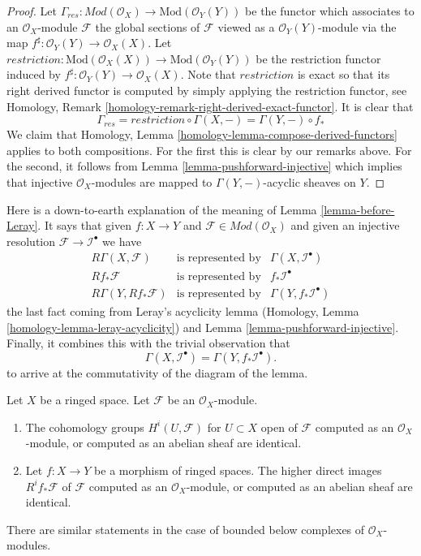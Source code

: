 \begin{proof}
Let
$\Gamma_{res} : \textit{Mod}(\mathcal{O}_X) \to \text{Mod}(\mathcal{O}_Y(Y))$
be the functor which associates to an $\mathcal{O}_X$-module $\mathcal{F}$
the global sections of $\mathcal{F}$ viewed as a $\mathcal{O}_Y(Y)$-module
via the map $f^\sharp : \mathcal{O}_Y(Y) \to \mathcal{O}_X(X)$. Let
$restriction : \text{Mod}(\mathcal{O}_X(X)) \to \text{Mod}(\mathcal{O}_Y(Y))$
be the restriction functor induced by
$f^\sharp : \mathcal{O}_Y(Y) \to \mathcal{O}_X(X)$. Note that $restriction$
is exact so that
its right derived functor is computed by simply applying the restriction
functor, see
Homology, Remark \ref{homology-remark-right-derived-exact-functor}.
It is clear that
$$
\Gamma_{res}
=
restriction \circ \Gamma(X, -)
=
\Gamma(Y, -) \circ f_*
$$
We claim that
Homology, Lemma \ref{homology-lemma-compose-derived-functors}
applies to both compositions. For the first this is clear by our remarks
above. For the second, it follows from
Lemma \ref{lemma-pushforward-injective} which implies that
injective $\mathcal{O}_X$-modules are mapped to $\Gamma(Y, -)$-acyclic
sheaves on $Y$.
\end{proof}

\begin{remark}
\label{remark-elucidate-lemma}
Here is a down-to-earth explanation of the meaning of
Lemma \ref{lemma-before-Leray}. It says that given
$f : X \to Y$ and $\mathcal{F} \in \textit{Mod}(\mathcal{O}_X)$
and given an injective resolution $\mathcal{F} \to \mathcal{I}^\bullet$
we have
$$
\begin{matrix}
R\Gamma(X, \mathcal{F}) & \text{is represented by} &
\Gamma(X, \mathcal{I}^\bullet) \\
Rf_*\mathcal{F} & \text{is represented by} & f_*\mathcal{I}^\bullet \\
R\Gamma(Y, Rf_*\mathcal{F}) & \text{is represented by} &
\Gamma(Y, f_*\mathcal{I}^\bullet)
\end{matrix}
$$
the last fact coming from Leray's acyclicity lemma
(Homology, Lemma \ref{homology-lemma-leray-acyclicity})
and Lemma \ref{lemma-pushforward-injective}.
Finally, it combines this with the trivial observation that
$$
\Gamma(X, \mathcal{I}^\bullet)
=
\Gamma(Y, f_*\mathcal{I}^\bullet).
$$
to arrive at the commutativity of the diagram of the lemma.
\end{remark}

\begin{lemma}
\label{lemma-modules-abelian}
Let $X$ be a ringed space.
Let $\mathcal{F}$ be an $\mathcal{O}_X$-module.
\begin{enumerate}
\item The cohomology groups $H^i(U, \mathcal{F})$ for $U \subset X$ open
of $\mathcal{F}$ computed as an $\mathcal{O}_X$-module, or computed as an
abelian sheaf are identical.
\item Let $f : X \to Y$ be a morphism of ringed spaces.
The higher direct images $R^if_*\mathcal{F}$ of $\mathcal{F}$
computed as an $\mathcal{O}_X$-module, or computed as an abelian sheaf
are identical.
\end{enumerate}
There are similar statements in the case of bounded below
complexes of $\mathcal{O}_X$-modules.
\end{lemma}

